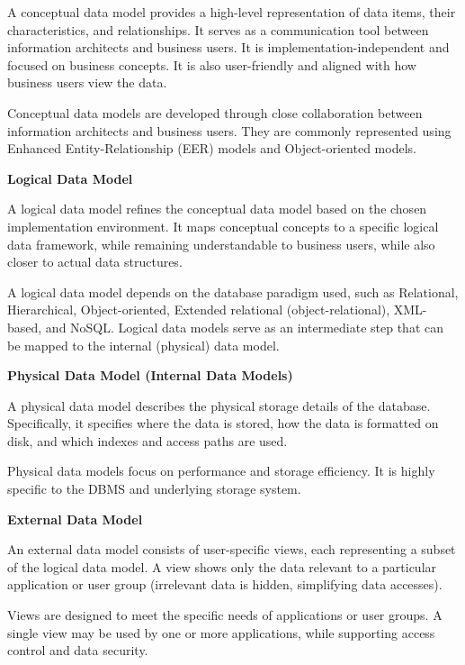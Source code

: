 \documentclass[11pt]{article}
\begin{document}
A conceptual data model provides a high-level representation of data items, their characteristics, and relationships. It serves as a communication tool between information architects and business users. It is implementation-independent and focused on business concepts. It is also user-friendly and aligned with how business users view the data.

Conceptual data models are developed through close collaboration between information architects and business users. They are commonly represented using Enhanced Entity-Relationship (EER) models and Object-oriented models.

\vspace{11pt}
\textbf{Logical Data Model}
\vspace{11pt}

A logical data model refines the conceptual data model based on the chosen implementation environment. It maps conceptual concepts to a specific logical data framework, while remaining understandable to business users, while also closer to actual data structures.

A logical data model depends on the database paradigm used, such as Relational, Hierarchical, Object-oriented, Extended relational (object-relational), XML-based, and NoSQL. Logical data models serve as an intermediate step that can be mapped to the internal (physical) data model.

\vspace{11pt}
\textbf{Physical Data Model (Internal Data Models)}
\vspace{11pt}

A physical data model describes the physical storage details of the database. Specifically, it specifies where the data is stored, how the data is formatted on disk, and which indexes and access paths are used.

Physical data models focus on performance and storage efficiency. It is highly specific to the DBMS and underlying storage system.

\vspace{11pt}
\textbf{External Data Model}
\vspace{11pt}

An external data model consists of user-specific views, each representing a subset of the logical data model. A view shows only the data relevant to a particular application or user group (irrelevant data is hidden, simplifying data accesses).

Views are designed to meet the specific needs of applications or user groups. A single view may be used by one or more applications, while supporting access control and data security.
\end{document}
